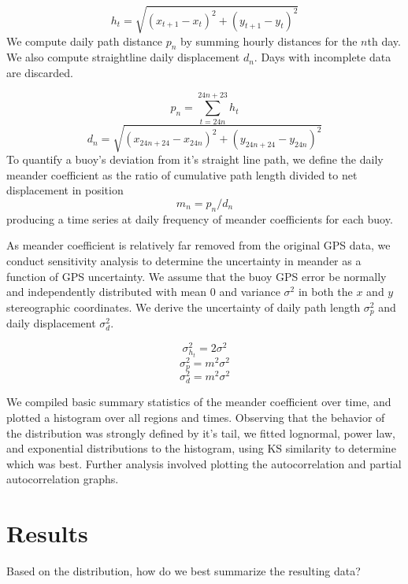 \documentclass[12pt]{article}
\begin{document}
\begin{multicols}{2}
$$h_t = \sqrt{(x_{t+1} - x_{t})^2 + (y_{t+1} - y_{t})^2}$$
We compute daily path distance $p_n$ by summing hourly distances for the $n$th day.
We also compute straightline daily displacement $d_n$.
Days with incomplete data are discarded.

$$p_n = \sum_{t=24n}^{24n+23}{h_t}$$
$$d_n = \sqrt{(x_{24n+24} - x_{24n})^2 + (y_{24n+24} - y_{24n})^2}$$
To quantify a buoy's deviation from it's straight line path,
we define the daily meander coefficient as the ratio of 
cumulative path length divided to net displacement in position
$$m_n = p_n/d_n$$
producing a time series at daily frequency of meander coefficients for each buoy.

As meander coefficient is relatively far removed from the original GPS data, 
we conduct sensitivity analysis to determine the uncertainty 
in meander as a function of GPS uncertainty. We assume that the buoy GPS error
be normally and independently distributed with mean $0$ and 
variance $\sigma^2$ in both the $x$ and $y$ stereographic coordinates. We
derive the uncertainty of daily path length $\sigma_p^2$ and daily displacement $\sigma_d^2$.

$$\sigma_{h_t}^2 = 2\sigma^2$$
$$\sigma_p^2 = m^2\sigma^2$$
$$\sigma_d^2 = m^2\sigma^2$$

We compiled basic summary statistics of the meander coefficient over time, and plotted 
a histogram over all regions and times. Observing that the behavior of the 
distribution was strongly defined by it's tail, we fitted lognormal, power law, and exponential distributions
to the histogram, using KS similarity to determine which was best. Further analysis 
involved plotting the autocorrelation and partial autocorrelation graphs.
\end{multicols}

\section{Results}

Based on the distribution, how do we best summarize the resulting data?
\end{document}
